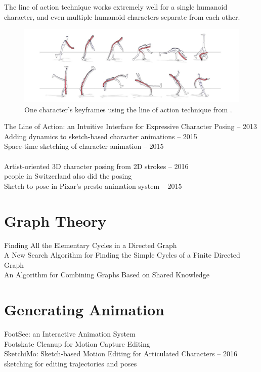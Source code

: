 The line of action technique works extremely well for a single humanoid character, and even multiple humanoid characters separate from each other. 

\begin{figure}[!h]
\includegraphics[scale=0.4]{img/baseline}
\caption{One character's keyframes using the line of action technique from \citep{guay2013line}.}
\end{figure}

The Line of Action: an Intuitive Interface for Expressive Character Posing -- 2013\\
Adding dynamics to sketch-based character animations -- 2015\\
Space-time sketching of character animation -- 2015\\
\\
Artist-oriented 3D character posing from 2D strokes -- 2016\\
people in Switzerland also did the posing \\
Sketch to pose in Pixar's presto animation system -- 2015


\section{Graph Theory}
Finding All the Elementary Cycles in a Directed Graph\\
A New Search Algorithm for Finding the Simple Cycles of a Finite Directed Graph\\
An Algorithm for Combining Graphs Based on Shared Knowledge

\section{Generating Animation}
FootSee: an Interactive Animation System\\
Footskate Cleanup for Motion Capture Editing\\
SketchiMo: Sketch-based Motion Editing for Articulated Characters -- 2016\\
sketching for editing trajectories and poses

